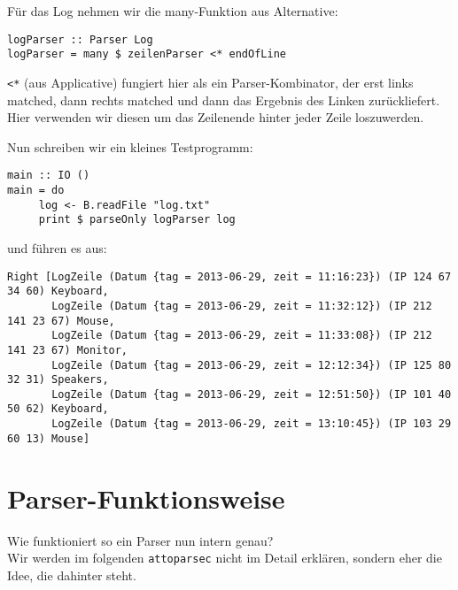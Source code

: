\documentclass{beamer}
\begin{document}
\begin{frame}[fragile]
Für das Log nehmen wir die many-Funktion aus \glqq Alternative\grqq :
\begin{verbatim}
logParser :: Parser Log
logParser = many $ zeilenParser <* endOfLine
\end{verbatim}
\pause
\texttt{<*} (aus Applicative) fungiert hier als ein Parser-Kombinator, der erst links matched, dann rechts matched und dann das Ergebnis des Linken zurückliefert.\\
\pause
Hier verwenden wir diesen um das Zeilenende hinter jeder Zeile loszuwerden.
\end{frame}

\begin{frame}[fragile]
Nun schreiben wir ein kleines Testprogramm:
\begin{verbatim}
main :: IO ()
main = do
     log <- B.readFile "log.txt"
     print $ parseOnly logParser log
\end{verbatim}
und führen es aus:
\tiny
\begin{verbatim}
Right [LogZeile (Datum {tag = 2013-06-29, zeit = 11:16:23}) (IP 124 67 34 60) Keyboard,
       LogZeile (Datum {tag = 2013-06-29, zeit = 11:32:12}) (IP 212 141 23 67) Mouse,
       LogZeile (Datum {tag = 2013-06-29, zeit = 11:33:08}) (IP 212 141 23 67) Monitor,
       LogZeile (Datum {tag = 2013-06-29, zeit = 12:12:34}) (IP 125 80 32 31) Speakers,
       LogZeile (Datum {tag = 2013-06-29, zeit = 12:51:50}) (IP 101 40 50 62) Keyboard,
       LogZeile (Datum {tag = 2013-06-29, zeit = 13:10:45}) (IP 103 29 60 13) Mouse]
\end{verbatim}
\normalsize

\end{frame}

\section{Parser-Funktionsweise}
\begin{frame}[fragile]
Wie funktioniert so ein Parser nun intern genau?\\
\bigskip
\pause
Wir werden im folgenden \texttt{attoparsec} nicht im Detail erklären, sondern eher die Idee, die dahinter steht.
\end{frame}
\end{document}
